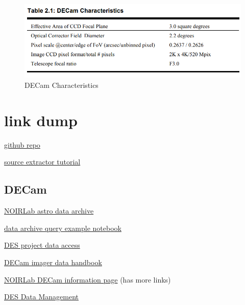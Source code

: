 \documentclass{article}
\begin{document}
\begin{figure}
    \centering
    \includegraphics[width=0.5\linewidth]{Decam Characteristics.png}
    \caption{DECam Characteristics}
    \label{fig:enter-label}
\end{figure}

  \section{link dump}

  \href{https://github.com/cyb0rb/WiFeS_Catalog}{github repo}
  
  \href{https://sep.readthedocs.io/en/v1.1.x/tutorial.html}{source extractor tutorial}

\subsection{DECam}
  \href{https://astroarchive.noirlab.edu/api/docs/}{NOIRLab astro data archive}

  \href{https://github.com/NOAO/nat-nb/blob/master/sia.ipynb}{data archive query example notebook}

  \href{https://www.darkenergysurvey.org/the-des-project/data-access/}{DES project data access}

  \href{https://noirlab.edu/science/sites/default/files/media/archives/documents/scidoc0436.pdf}{DECam imager data handbook}
  
  \href{https://noirlab.edu/science/programs/ctio/instruments/Dark-Energy-Camera}{NOIRLab DECam information page} (has more links)
  
  \href{https://des.ncsa.illinois.edu/releases/other}{DES Data Management}
\end{document}
